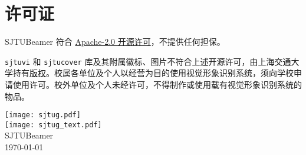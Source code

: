 \documentclass[
    UTF8,
    heading=true,
    12pt,
    a4paper
]{ctexrep}
\def\themename{\textsf{SJTUBeamer}}
\begin{document}
\chapter*{许可证}

\themename{} 符合 \href{https://github.com/sjtug/SJTUBeamer/blob/main/LICENSE}{Apache-2.0 开源许可}，不提供任何担保。

\texttt{sjtuvi} 和 \texttt{sjtucover} 库及其附属徽标、图片不符合上述开源许可，由上海交通大学持有\href{https://vi.sjtu.edu.cn/index.php/articles/bulletin/16}{版权}。校属各单位及个人以经营为目的使用视觉形象识别系统，须向学校申请使用许可。校外单位及个人未经许可，不得制作或使用载有视觉形象识别系统的物品。

\def\sjtuglogo{
  \texttt{[image: sjtug.pdf]}\\
  \vspace*{5pt}
  \texttt{[image: sjtug\_text.pdf]}
}

\vfill
{
\centering
\sjtuglogo\\
{\large \themename{}\\}
\today\\
}
\vfill
\end{document}
